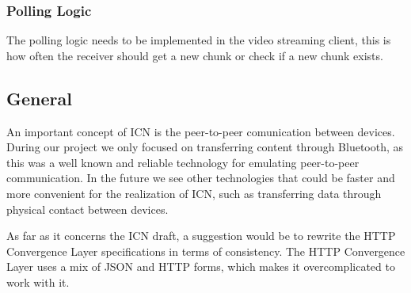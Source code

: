 \subsubsection{Polling Logic}

The polling logic needs to be implemented in the video streaming client, this is how often the receiver should get 
a new chunk or check if a new chunk exists.

\subsection{General}

An important concept of ICN is the peer-to-peer comunication between devices. 
During our project we only focused on transferring content
through Bluetooth, as this was a well known and reliable technology for emulating peer-to-peer communication.
In the future we see other technologies that could be faster and more convenient for the realization of ICN,
such as transferring data through physical contact between devices.

As far as it concerns the ICN draft, a suggestion would be to rewrite the HTTP Convergence Layer specifications
in terms of consistency. The HTTP Convergence Layer uses a mix of JSON and HTTP forms, which makes it
overcomplicated to work with it.
